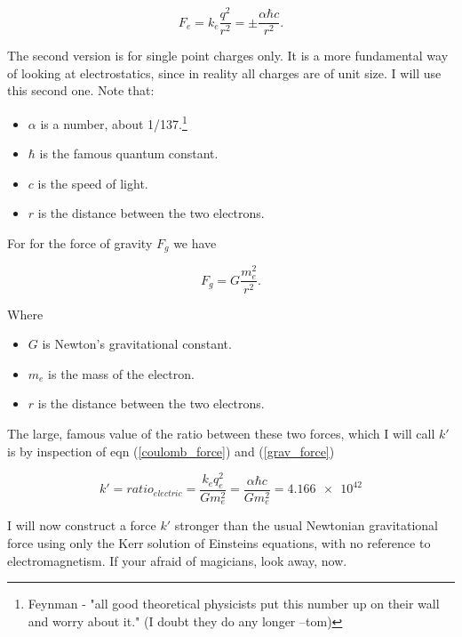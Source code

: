 \documentclass[../rzero]{subfiles}
\begin{document}
\begin{equation}\label{coulomb_force}
	F_e = k_e\frac{q^2}{r^2} = \pm \frac{\alpha \hbar c}{r^2}.
\end{equation}

The second version is for single point charges only. It is a more fundamental way of looking at electrostatics, since in reality all charges are of unit size. I will use this second one. Note that:

\begin{itemize}
  \item $\alpha$ is a number, about 1/137.\footnote{Feynman - "all good theoretical physicists put this number up on their wall and worry about it." (I doubt they do any longer --tom) }
  \item $\hbar$ is the famous quantum constant.
  \item $c$ is the speed of light.
  \item $r$ is the distance between the two electrons.
\end{itemize}

For for the force of gravity $F_g$ we have

\begin{equation} \label{grav_force}
	F_g = G\frac{m_e^2}{r^2}.
\end{equation}

Where

\begin{itemize}
  \item $G$ is Newton's gravitational constant.
  \item $m_e$ is the mass of the electron.
  \item $r$ is the distance between the two electrons.
\end{itemize}

The large, famous value of the ratio between these two forces, which I will call $k'$ is by inspection of eqn (\ref{coulomb_force}) and (\ref{grav_force})

\begin{equation} \label{electric_ratio}
	k' = ratio_{electric} = \frac{k_e q_e^2}{G m_e^2} = \frac{\alpha \hbar c}{G m_e^2} = \num{4.166e42}
\end{equation}


I will now construct a force $k'$ stronger than the usual Newtonian gravitational force using only the Kerr solution of Einsteins equations, with no reference to electromagnetism. If your afraid of magicians, look away, now.
\end{document}
